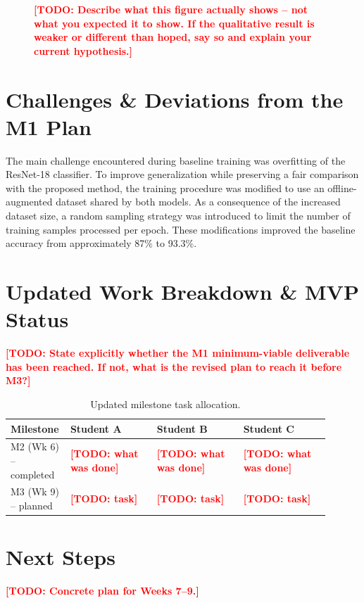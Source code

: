 \documentclass[11pt]{article}
\newcommand{\todo}[1]{\textcolor{red}{\textbf{[TODO: #1]}}}
\begin{document}
\begin{figure}[h]
\centering
\caption{\todo{Describe what this figure actually shows -- not what you expected it to
show. If the qualitative result is weaker or different than hoped, say so and explain
your current hypothesis.}}
\label{fig:prelim}
\end{figure}

\section{Challenges \& Deviations from the M1 Plan}
\label{sec:challenges}
The main challenge encountered during baseline training was overfitting of the ResNet-18 classifier.
To improve generalization while preserving a fair comparison with the proposed method, the training procedure was modified to use an offline-augmented dataset shared by both models.
As a consequence of the increased dataset size, a random sampling strategy was introduced to limit the number of training samples processed per epoch.
These modifications improved the baseline accuracy from approximately 87\% to 93.3\%.

\section{Updated Work Breakdown \& MVP Status}
\label{sec:workbreakdown}
\todo{State explicitly whether the M1 minimum-viable deliverable has been reached. If
not, what is the revised plan to reach it before M3?}

\begin{table}[h]
\centering
\caption{Updated milestone task allocation.}
\label{tab:tasks}
\begin{tabular}{@{}p{0.12\linewidth}p{0.26\linewidth}p{0.26\linewidth}p{0.26\linewidth}@{}}
\toprule
\textbf{Milestone} & \textbf{Student A} & \textbf{Student B} & \textbf{Student C} \\
\midrule
M2 (Wk 6) -- completed & \todo{what was done} & \todo{what was done} & \todo{what was done} \\
M3 (Wk 9) -- planned   & \todo{task} & \todo{task} & \todo{task} \\
\bottomrule
\end{tabular}
\end{table}

\section{Next Steps}
\label{sec:next}
\todo{Concrete plan for Weeks 7--9.}



\end{document}
